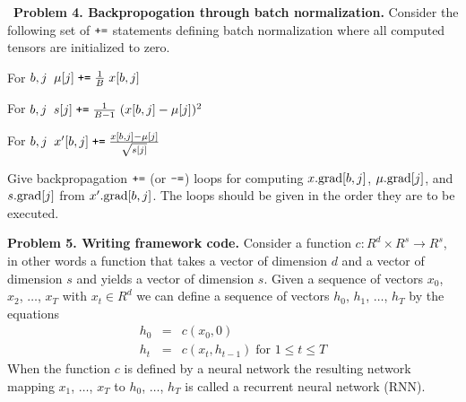 \documentclass{article}
\newcommand{\solution}[1]{}
\begin{document}
\medskip
~{\bf Problem 4. Backpropogation through batch normalization.}
Consider the following set of $\mbox{\tt +=}$ statements defining batch normalization
where all computed tensors are initialized to zero.

\medskip
For $b,j \;\;\mu[j] \;\mbox{\tt +=}\; \frac{1}{B}\;x[b,j]$

\medskip
For $b,j\;\;s[j] \;\mbox{\tt +=}\; \frac{1}{B-1}\;(x[b,j] - \mu[j])^2$

\medskip
For $b,j\;\;x'[b,j] \;\mbox{\tt +=}\; \frac{x[b,j] - \mu[j]}{\sqrt{s[j]}}$

\medskip
Give backpropagation $\mbox{\tt +=}$ (or $\mbox{\tt -=}$) loops for computing $x.\mathrm{grad}[b,j]$, $\mu.\mathrm{grad}[j]$, and $s.\mathrm{grad}[j]$ from $x'.\mathrm{grad}[b,j]$.
The loops should be given in the order they are to be executed.

\medskip
\solution{

  $$\begin{array}{lrcl}

    \mbox{For}\;b,j & x.grad[b,j] &\pluseq & \frac{x'.\grad[b,j]}{\sqrt{s[j]}} \\
    \\
    \mbox{For}\; b,j & \mu.grad[j] &\minuseq & \frac{x'.\grad[b,j]}{\sqrt{s[j]}} \\
    \\
    \mbox{For}\; b,j & s.grad[j] &\minuseq & \frac{1}{2}(x[b,j] - \mu[j])s[j]^{-3/2}\;x'.grad[b,j] \\
    \\
    \mbox{For}\; b,j & x.grad[b,j] &\pluseq & \frac{2}{B-1}\;(x[b,j] - \mu[j])s.\grad[j] \\
    \\
    \mbox{For}\; b,j & \mu.\grad[j] &\minuseq & \frac{2}{B-1}\;(x[b,j] - \mu[j])s.\grad[j] \\
    \\
    \mbox{For}\; b,j & x.grad[b,j] &\pluseq & \frac{1}{B}\;\mu.\grad[j]
  \end{array}$$
}

\bigskip

{\bf Problem 5. Writing framework code.} Consider a function $c:R^d \times R^s \rightarrow R^s$, in other words a function that takes a
vector of dimension $d$ and a vector of dimension $s$ and yields a vector of dimension
$s$.  Given a sequence of vectors $x_0$, $x_2$, $\ldots$, $x_T$ with $x_t \in R^d$ we can define a sequence of vectors $h_0$, $h_1$, $\ldots$, $h_T$ by the equations
\begin{eqnarray*}
  h_{0} & = & c(x_0,0) \\
  h_{t} & = & c(x_t,h_{t-1})\;\mbox{for $1 \leq t \leq T$} 
\end{eqnarray*}
When the function $c$ is defined by a neural network the resulting network mapping $x_1$, $\ldots$, $x_T$ to $h_0$, $\ldots$, $h_T$ is called a recurrent neural network (RNN).
\end{document}
